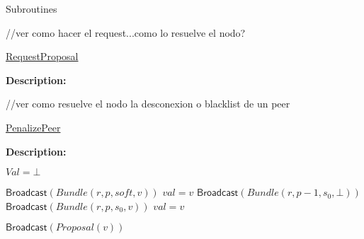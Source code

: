 \documentclass[10pt,a4paper]{article}
\begin{document}
\begin{section}{Subroutines}

\begin{algorithm}[H]
    \begin{algorithmic}[1]
        //ver como hacer el request...como lo resuelve el nodo?
    \EndFunction
    \end{algorithmic}
    \caption{\underline{RequestProposal}}
\end{algorithm}

\noindent \textbf{Description:}\\


\begin{algorithm}[H]
    \begin{algorithmic}[1]
        //ver como resuelve el nodo la desconexion o blacklist de un peer
    \EndFunction
    \end{algorithmic}
    \caption{\underline{PenalizePeer}}
\end{algorithm}

\noindent \textbf{Description:}\\


\begin{algorithm}[H]
    \begin{algorithmic}[1]


    \State $Val = \bot$

        \State $\mathsf{Broadcast}(Bundle(r, p, soft, v))$
        \State $val = v$    
        \State $\mathsf{Broadcast}(Bundle(r, p - 1, s_0, \bot))$
        \State $\mathsf{Broadcast}(Bundle(r, p, s_0, v))$
        \State $val = v$
    \EndIf

        \State $\mathsf{Broadcast}(Proposal(v))$
    \EndIf


\end{algorithmic}
\end{algorithm}
\end{section}
\end{document}
